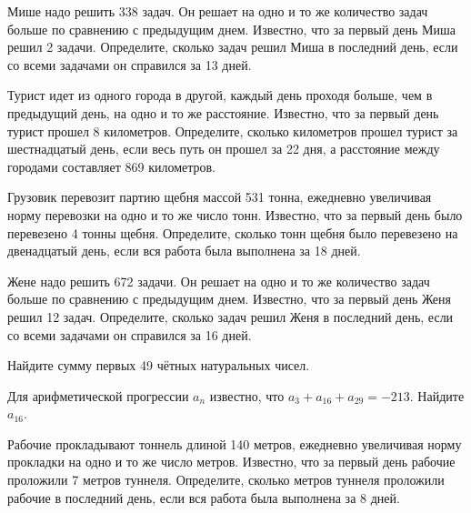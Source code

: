 \documentclass[4apaper]{article}
\begin{document}
\begin{taskBN}{46}
Мише надо решить 338 задач. Он решает на одно и то же количество задач больше по сравнению с предыдущим днем. Известно, что за первый день Миша решил 2 задачи. Определите, сколько задач решил Миша в последний день, если со всеми задачами он справился за 13 дней.
\end{taskBN}

\begin{taskBN}{47}
Турист идет из одного города в другой, каждый день проходя больше, чем в предыдущий день, на одно и то же расстояние. Известно, что за первый день турист прошел 8 километров. Определите, сколько километров прошел турист за шестнадцатый день, если весь путь он прошел за 22 дня, а расстояние между городами составляет 869 километров.
\end{taskBN}

\begin{taskBN}{48}
Грузовик перевозит партию щебня массой 531 тонна, ежедневно увеличивая норму перевозки на одно и то же число тонн. Известно, что за первый день было перевезено 4 тонны щебня. Определите, сколько тонн щебня было перевезено на двенадцатый день, если вся работа была выполнена за 18 дней.
\end{taskBN}

\begin{taskBN}{49}
Жене надо решить 672 задачи. Он решает на одно и то же количество задач больше по сравнению с предыдущим днем. Известно, что за первый день Женя решил 12 задач. Определите, сколько задач решил Женя в последний день, если со всеми задачами он справился за 16 дней.
\end{taskBN}

\begin{taskBN}{50}
Найдите сумму первых 49 чётных натуральных чисел.
\end{taskBN}

\begin{taskBN}{51}
Для арифметической прогрессии ${a_n}$ известно, что $a_{3} + a_{16} + a_{29}= -213$. Найдите $a_{16}$.
\end{taskBN}

\begin{taskBN}{52}
 Рабочие прокладывают тоннель длиной 140 метров, ежедневно увеличивая норму прокладки на одно и то же число метров. Известно, что за первый день рабочие проложили 7 метров туннеля.  Определите, сколько метров туннеля проложили рабочие в последний день, если вся работа была выполнена за 8 дней.
\end{taskBN}
\end{document}
